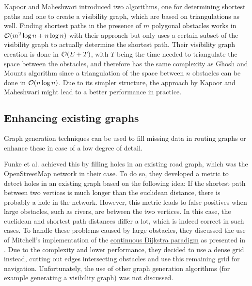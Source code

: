 		Kapoor and Maheshwari introduced two algorithms, one for determining shortest paths and one to create a visibility graph, which are based on triangulations as well\cite{kapoor-shortest-path-vgraph}.
		Finding shortest paths in the presence of $m$ polygonal obstacles works in $\mathcal{O}(m^2 \log{n} + n\log{n})$ with their approach but only uses a certain subset of the visibility graph to actually determine the shortest path.
		Their visibility graph creation is done in $\mathcal{O}(E+T)$, with $T$ being the time needed to triangulate the space between the obstacles, and therefore has the same complexity as Ghosh and Mounts algorithm since a triangulation of the space between $n$ obstacles can be done in $\mathcal{O}(n \log{n})$.
		Due to its simpler structure, the approach by Kapoor and Maheshwari might lead to a better performance in practice.
		
		
	
	\subsection{Enhancing existing graphs}
	
		Graph generation techniques can be used to fill missing data in routing graphs or enhance these in case of a low degree of detail.
		
		Funke et al. achieved this by filling holes in an existing road graph, which was the OpenStreetMap network in their case\cite{funke-osm-extrapolation}.
		To do so, they developed a metric to detect holes in an existing graph based on the following idea:
		If the shortest path between two vertices is much longer than the euclidean distance, there is probably a hole in the network.
		However, this metric leads to false positives when large obstacles, such as rivers, are between the two vertices.
		In this case, the euclidean and shortest path distances differ a lot, which is indeed correct in such cases.
		To handle these problems caused by large obstacles, they discussed the use of Mitchell's implementation of the \hyperref[subsec:continuous-dijkstra]{continuous Dijkstra paradigm} as presented in .
		Due to the complexity and lower performance, they decided to use a dense grid instead, cutting out edges intersecting obstacles and use this remaining grid for navigation.
		Unfortunately, the use of other graph generation algorithms (for example generating a visibility graph) was not discussed.
		

